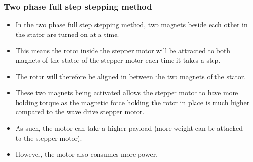 \documentclass[11pt]{article}
\begin{document}
 \newpage

\subsubsection{Two phase full step stepping method}
\label{sec:org11d67ba}
\begin{itemize}
\item In the two phase full step stepping method, two magnets beside each other in the stator are turned on at a time.
\item This means the rotor inside the stepper motor will be attracted to both magnets of the stator of the stepper motor each time it takes a step.
\item The rotor will therefore be aligned in between the two magnets of the stator.
\item These two magnets being activated allows the stepper motor to have more holding torque as the magnetic force holding the rotor in place is much higher compared to the wave drive stepper motor.
\item As such, the motor can take a higher payload (more weight can be attached to the stepper motor).
\item However, the motor also consumes more power.
\end{itemize}

 \newpage
\end{document}
